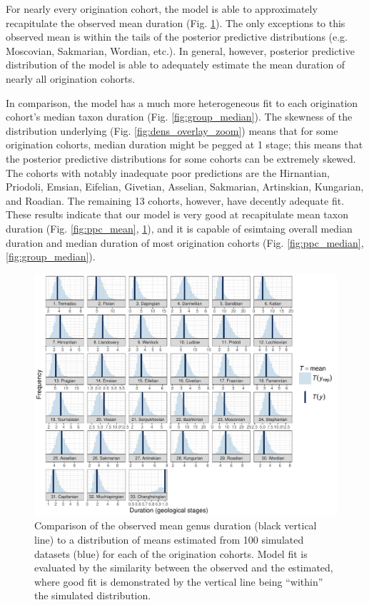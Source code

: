 \documentclass[11pt]{article}
\begin{document}
For nearly every origination cohort, the model is able to approximately recapitulate the observed mean duration (Fig. \ref{fig:group_mean}). The only exceptions to this observed mean is within the tails of the posterior predictive distributions (e.g. Moscovian, Sakmarian, Wordian, etc.). In general, however, posterior predictive distribution of the model is able to adequately estimate the mean duration of nearly all origination cohorts.

In comparison, the model has a much more heterogeneous fit to each origination cohort's median taxon duration (Fig. \ref{fig:group_median}). The skewness of the distribution underlying (Fig. \ref{fig:dens_overlay_zoom}) means that for some origination cohorts, median duration might be pegged at 1 stage; this means that the posterior predictive distributions for some cohorts can be extremely skewed. The cohorts with notably inadequate poor predictions are the Hirnantian, Priodoli, Emsian, Eifelian, Givetian, Asselian, Sakmarian, Artinskian, Kungarian, and Roadian. The remaining 13 cohorts, however, have decently adequate fit. These results indicate that our model is very good at recapitulate mean taxon duration (Fig. \ref{fig:ppc_mean}, \ref{fig:group_mean}), and it is capable of esimtaing overall median duration and median duration of most origination cohorts (Fig. \ref{fig:ppc_median}, \ref{fig:group_median}).

\begin{figure}[ht]
  \centering
  \includegraphics[height = 0.5\textheight,width=\textwidth,keepaspectratio=true]{figure/ppc_mean_group_cweib_cens}
  \caption{ Comparison of the observed mean genus duration (black vertical line) to a distribution of means estimated from 100 simulated datasets (blue) for each of the origination cohorts. Model fit is evaluated by the similarity between the observed and the estimated, where good fit is demonstrated by the vertical line being ``within'' the simulated distribution. }
  \label{fig:group_mean}
\end{figure}
\end{document}
